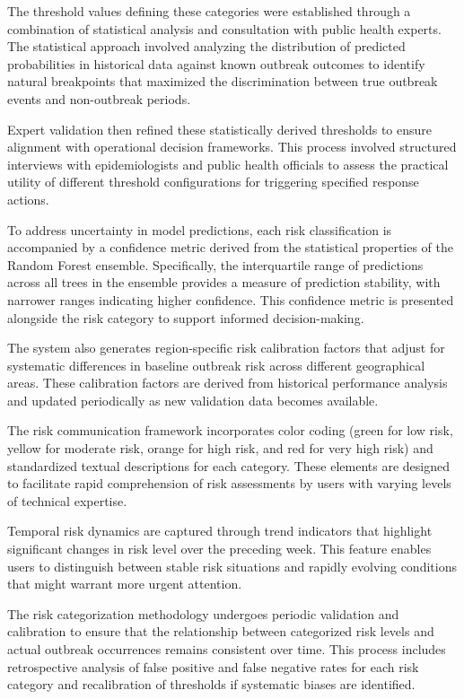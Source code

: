 \documentclass[12pt,a4paper]{report}
\begin{document}
The threshold values defining these categories were established through a combination of statistical analysis and consultation with public health experts. The statistical approach involved analyzing the distribution of predicted probabilities in historical data against known outbreak outcomes to identify natural breakpoints that maximized the discrimination between true outbreak events and non-outbreak periods.

Expert validation then refined these statistically derived thresholds to ensure alignment with operational decision frameworks. This process involved structured interviews with epidemiologists and public health officials to assess the practical utility of different threshold configurations for triggering specified response actions.

To address uncertainty in model predictions, each risk classification is accompanied by a confidence metric derived from the statistical properties of the Random Forest ensemble. Specifically, the interquartile range of predictions across all trees in the ensemble provides a measure of prediction stability, with narrower ranges indicating higher confidence. This confidence metric is presented alongside the risk category to support informed decision-making.

The system also generates region-specific risk calibration factors that adjust for systematic differences in baseline outbreak risk across different geographical areas. These calibration factors are derived from historical performance analysis and updated periodically as new validation data becomes available.

The risk communication framework incorporates color coding (green for low risk, yellow for moderate risk, orange for high risk, and red for very high risk) and standardized textual descriptions for each category. These elements are designed to facilitate rapid comprehension of risk assessments by users with varying levels of technical expertise.

Temporal risk dynamics are captured through trend indicators that highlight significant changes in risk level over the preceding week. This feature enables users to distinguish between stable risk situations and rapidly evolving conditions that might warrant more urgent attention.

The risk categorization methodology undergoes periodic validation and calibration to ensure that the relationship between categorized risk levels and actual outbreak occurrences remains consistent over time. This process includes retrospective analysis of false positive and false negative rates for each risk category and recalibration of thresholds if systematic biases are identified.
\end{document}
